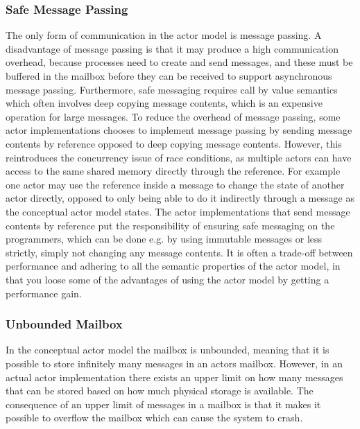 \subsubsection{Safe Message Passing}
The only form of communication in the actor model is message passing. A disadvantage of message passing is that it may produce a high communication overhead, because processes need to create and send messages, and these must be buffered in the mailbox before they can be received to support asynchronous message passing\cite[p. 17]{haller2012actors}. Furthermore, safe messaging requires call by value semantics which often involves deep copying message contents, which is an expensive operation for large messages. To reduce the overhead of message passing, some actor implementations chooses to implement message passing by sending message contents by reference opposed to deep copying message contents. However, this reintroduces the concurrency issue of race conditions, as multiple actors can have access to the same shared memory directly through the reference. For example one actor may use the reference inside a message to change the state of another actor directly, opposed to only being able to do it indirectly through a message as the conceptual actor model states. The actor implementations that send message contents by reference put the responsibility of ensuring safe messaging on the programmers, which can be done e.g. by using immutable messages or less strictly, simply not changing any message contents. It is often a trade-off between performance and adhering to all the semantic properties of the actor model, in that you loose some of the advantages of using the actor model by getting a performance gain.

\subsubsection{Unbounded Mailbox}
In the conceptual actor model the mailbox is unbounded, meaning that it is possible to store infinitely many messages in an actors mailbox. However, in an actual actor implementation there exists an upper limit on how many messages that can be stored based on how much physical storage is available. The consequence of an upper limit of messages in a mailbox is that it makes it possible to overflow the mailbox which can cause the system to crash\cite[p. 152]{sevenModels}.

